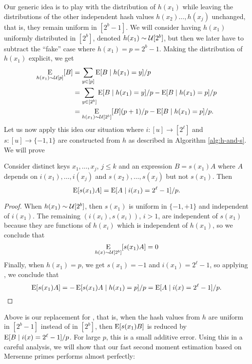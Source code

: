 Our generic idea is to play with the distribution of $h(x_1)$ while
leaving the distributions of the other independent hash values
$h(x_2)\ldots,h(x_j)$ unchanged, that is, they remain uniform in
$[2^b-1]$. We will consider having $h(x_1)$ uniformly distributed in
$[2^b]$, denoted $h(x_1) \sim \mathcal{U}[2^b]$, but then we later have to
subtract the ``fake'' case where $h(x_1)=p=2^b-1$.  Making the
distribution of $h(x_1)$ explicit, we get
\begin{equation}\begin{split}
  \operatorname*{E}_{h(x_1) \sim \mathcal{U}[p]}[B]&=\sum_{y\in[p]}\operatorname*{E}[B \mid h(x_1)=y]/p
                            \\&=\sum_{y\in[2^b]}\operatorname*{E}[B \mid h(x_1)=y]/p - \operatorname*{E}[B \mid h(x_1)=p]/p
                            \\ &=\operatorname*{E}_{h(x_1) \sim \mathcal{U}[2^b]}[B](p+1)/p - \operatorname*{E}[B \mid h(x_1)=p]/p.\label{eq:play-with-dist}
\end{split}\end{equation}
Let us now apply this idea our situation where $i:[u]\to[2^\ell]$ and
$s:[u]\to\{-1,1\}$ are constructed from $h$ as described in Algorithm
\ref{alg:h-and-s}. We will prove
\begin{lemma}\label{lem:remove-si}  Consider distinct keys $x_1,\ldots,x_j$, $j\leq k$ and an expression $B=s(x_1)A$ where $A$
   depends on $i(x_1),\ldots,i(x_j)$ and $s(x_2),\ldots,s(x_j)$ but not
   $s(x_1)$. Then
   \begin{equation}\label{eq:remove-si}
      \operatorname*{E}[s(x_1)A]=\operatorname*{E}[A\mid i(x_1)=2^\ell-1]/p.
   \end{equation}
\end{lemma}
\begin{proof}
When $h(x_1) \sim \mathcal{U}[2^b]$, then $s(x_1)$ is uniform
in $\{-1,+1\}$ and independent of $i(x_1)$. The remaining
$(i(x_i),s(x_i))$, $i>1$, are independent of $s(x_1)$ because they
are functions of $h(x_i)$ which is independent of $h(x_1)$, so
we conclude that 
\[\operatorname*{E}_{h(x) \sim \mathcal{U}[2^b]}[s(x_1)A]=0\]
Finally, when $h(x_1)=p$, we get $s(x_1)=-1$ and $i(x_1)=2^\ell-1$, 
so applying , we conclude
that 
\[\operatorname*{E}[s(x_1)A] = -\operatorname*{E}[s(x_1) A \mid h(x_1) = p]/p = \operatorname*{E}[A \mid i(x)=2^\ell-1]/p.\]
\end{proof}
Above  is our replacement for , that is,
when the hash values from $h$ are uniform in $[2^b-1]$ instead of
in $[2^b]$, then $\operatorname*{E}[s(x_1)B]$ is reduced by $\operatorname*{E}[B \mid i(x)=2^\ell-1]/p$.
For large $p$, this is a small additive error. Using this in a careful
analysis, we will show that our fast second moment estimation 
based on Mersenne primes performs almost perfectly:


